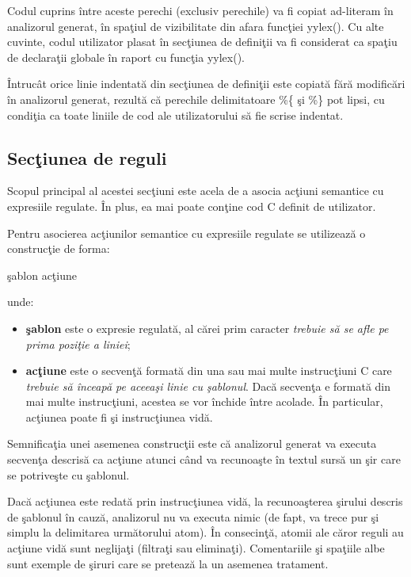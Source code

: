 Codul cuprins \^{i}ntre aceste perechi (exclusiv perechile) va fi copiat ad-literam \^{i}n analizorul generat, \^{i}n spa\c{t}iul de vizibilitate din afara func\c{t}iei yylex(). Cu alte cuvinte, codul utilizator plasat \^{i}n sec\c{t}iunea de defini\c{t}ii va fi considerat ca spa\c{t}iu de declara\c{t}ii globale \^{i}n raport cu func\c{t}ia yylex().

\^{I}ntruc\^{a}t orice linie indentat\u{a} din sec\c{t}iunea de defini\c{t}ii este copiat\u{a} f\u{a}r\u{a} modific\u{a}ri \^{i}n analizorul generat, rezult\u{a} c\u{a} perechile delimitatoare \%\{ \c{s}i \%\} pot lipsi, cu condi\c{t}ia ca toate liniile de cod ale utilizatorului s\u{a} fie scrise indentat. 

\subsection{Sec\c{t}iunea de reguli}

Scopul principal al acestei sec\c{t}iuni este acela de a asocia ac\c{t}iuni semantice cu expresiile regulate. \^{I}n plus, ea mai poate con\c{t}ine cod C definit de utilizator.

Pentru asocierea ac\c{t}iunilor semantice cu expresiile regulate se utilizeaz\u{a} o construc\c{t}ie de forma:
\begin{center}
\c{s}ablon ac\c{t}iune
\end{center}
unde:
\begin{itemize}
	\item \textbf{\c{s}ablon} este o expresie regulat\u{a}, al c\u{a}rei prim caracter \emph{trebuie s\u{a} se afle pe prima pozi\c{t}ie a liniei};
	\item \textbf{ac\c{t}iune} este o secven\c{t}\u{a} format\u{a} din una sau mai multe instruc\c{t}iuni C care \emph{trebuie s\u{a} \^{i}nceap\u{a} pe aceea\c{s}i linie cu \c{s}ablonul}. Dac\u{a} secven\c{t}a e format\u{a} din mai multe instruc\c{t}iuni, acestea se vor \^{i}nchide \^{i}ntre acolade. \^{I}n particular, ac\c{t}iunea poate fi \c{s}i instruc\c{t}iunea vid\u{a}.
\end{itemize}

Semnifica\c{t}ia unei asemenea construc\c{t}ii este c\u{a} analizorul generat va executa secven\c{t}a descris\u{a} ca ac\c{t}iune atunci c\^{a}nd va recunoa\c{s}te \^{i}n textul surs\u{a} un \c{s}ir care se potrive\c{s}te cu \c{s}ablonul. 

Dac\u{a} ac\c{t}iunea este redat\u{a} prin instruc\c{t}iunea vid\u{a}, la recunoa\c{s}terea \c{s}irului descris de \c{s}ablonul \^{i}n cauz\u{a}, analizorul nu va executa nimic (de fapt, va trece pur \c{s}i simplu la delimitarea urm\u{a}torului atom). \^{I}n consecin\c{t}\u{a}, atomii ale c\u{a}ror reguli au ac\c{t}iune vid\u{a} sunt neglija\c{t}i (filtra\c{t}i sau elimina\c{t}i). Comentariile \c{s}i spa\c{t}iile albe sunt exemple de \c{s}iruri care se preteaz\u{a} la un asemenea tratament.

